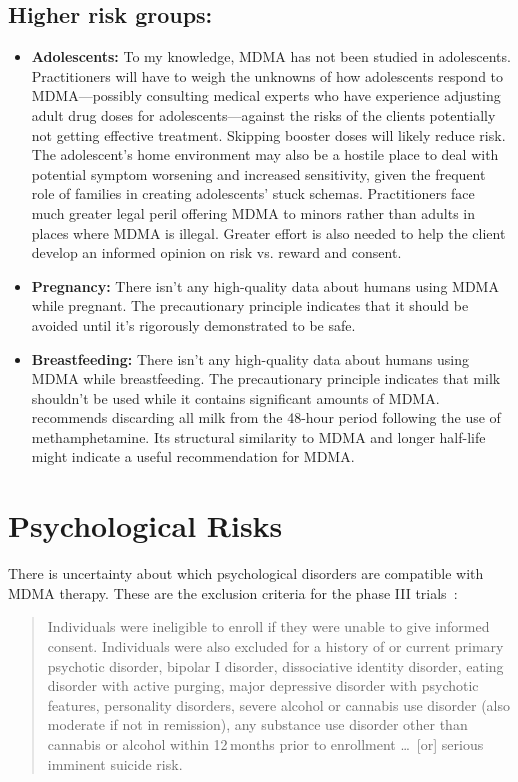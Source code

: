 \documentclass[11pt,oneside]{book}
\let\cite\parencite
\begin{document}
\subsection*{Higher risk groups:}
\begin{itemize}
    \item \textbf{Adolescents:} To my knowledge, MDMA has not been studied in adolescents. Practitioners will have to weigh the unknowns of how adolescents respond to MDMA---possibly consulting medical experts who have experience adjusting adult drug doses for adolescents---against the risks of the clients potentially not getting effective treatment. Skipping booster doses will likely reduce risk. The adolescent's home environment may also be a hostile place to deal with potential symptom worsening and increased sensitivity, given the frequent role of families in creating adolescents' stuck schemas. Practitioners face much greater legal peril offering MDMA to minors rather than adults in places where MDMA is illegal. Greater effort is also needed to help the client develop an informed opinion on risk vs. reward and consent.
    \item \textbf{Pregnancy:} There isn't any high-quality data about humans using MDMA while pregnant. The precautionary principle indicates that it should be avoided until it's rigorously demonstrated to be safe.
    \item \textbf{Breastfeeding:} There isn't any high-quality data about humans using MDMA while breastfeeding. The precautionary principle indicates that milk shouldn't be used while it contains significant amounts of MDMA. \textcite{bartuLactation} recommends discarding all milk from the 48-hour period following the use of methamphetamine. Its structural similarity to MDMA and longer half-life might indicate a useful recommendation for MDMA.
\end{itemize}

\section{Psychological Risks}
\label{psychologicalRisks}
There is uncertainty about which psychological disorders are compatible with MDMA therapy. These are the exclusion criteria for the phase III trials~\cite[Supplementary Information; p. 5]{mitchellMDMAClinicalTrial2}:
\begin{quotation}
    Individuals were ineligible to enroll if they were unable to give informed consent. Individuals were also excluded for a history of or current primary psychotic disorder, bipolar I disorder, dissociative identity disorder, eating disorder with active purging, major depressive disorder with psychotic features, personality disorders, severe alcohol or cannabis use disorder (also moderate if not in remission), any substance use disorder other than cannabis or alcohol within 12\,months prior to enrollment \dots\ [or] serious imminent suicide risk.
\end{quotation}
\end{document}
